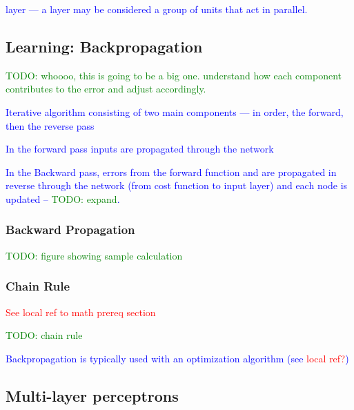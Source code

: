 \textcolor{blue}{layer --- a layer may be considered a group of units that act in parallel.}


\subsection{Learning: Backpropagation}

\textcolor{green}{TODO: whoooo, this is going to be a big one. understand how each component contributes to the error and adjust accordingly.}

\textcolor{blue}{Iterative algorithm consisting of two main components --- in order, the forward, then the reverse pass}

\textcolor{blue}{In the forward pass inputs are propagated through the network}

\textcolor{blue}{In the Backward pass, errors from the forward function and  are propagated in reverse through the network (from cost function to input layer) and each node is updated -- \textcolor{green}{TODO: expand}.}

\subsubsection{Backward Propagation}


\textcolor{green}{TODO: figure showing sample calculation}


\subsubsection{Chain Rule}

\textcolor{red}{See \textcolor{red}{local ref to math prereq section}}

\textcolor{green}{TODO: chain rule}

\textcolor{blue}{Backpropagation is typically used with an optimization algorithm (see \textcolor{red}{local ref?})}

\subsection{Multi-layer perceptrons}
